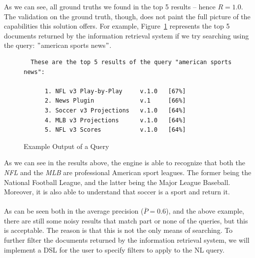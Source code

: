 As we can see, all ground truths we found in the top 5 results -- hence $R = 1.0$.
The validation on the ground truth, though, does not paint the full picture of the capabilities this solution offers.
For example, Figure~\ref{fig:query-example} represents the top 5 documents returned by the information retrieval system if we try searching using the query: \("\)american sports news\("\).
\begin{figure}
    \begin{verbatim}
  These are the top 5 results of the query "american sports news":

      1. NFL v3 Play-by-Play     v.1.0   [67%]
      2. News Plugin             v.1     [66%]
      3. Soccer v3 Projections   v.1.0   [64%]
      4. MLB v3 Projections      v.1.0   [64%]
      5. NFL v3 Scores           v.1.0   [64%]
    \end{verbatim}
    \caption{Example Output of a Query}
    \label{fig:query-example}
\end{figure}
As we can see in the results above, the engine is able to recognize that both the \textit{NFL} and the \textit{MLB} are professional American sport leagues.
The former being the National Football League, and the latter being the Major League Baseball.
Moreover, it is also able to understand that soccer is a sport and return it. \\ \\
As can be seen both in the average precision ($\overline{P} = 0.6$), and the above example, there are still some noisy results that match part or none of the queries, but this is acceptable.
The reason is that this is not the only means of searching.
To further filter the documents returned by the information retrieval system, we will implement a DSL for the user to specify filters to apply to the NL query.
